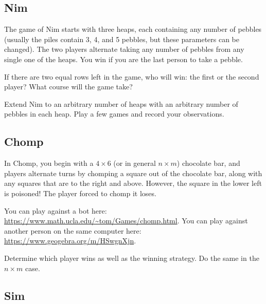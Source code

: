 \documentclass{article}
\begin{document}
\subsection{Nim}

The game of Nim starts with three heaps, each containing any number of pebbles (usually the piles contain 3, 4, and 5 pebbles, but these parameters can be changed).
The two players alternate taking any number of pebbles from any single one of the heaps.
You win if you are the last person to take a pebble.

\begin{exercise}
    If there are two equal rows left in the game, who will win: the first or the second player?
    What course will the game take?
\end{exercise}

\begin{exercise}
    Extend Nim to an arbitrary number of heaps with an arbitrary number of pebbles in each heap. 
    Play a few games and record your observations.
\end{exercise}

\subsection{Chomp}

In Chomp, you begin with a \(4\times 6\) (or in general \(n\times m\)) chocolate bar, and players alternate turns by chomping a square out of the chocolate bar, along with any squares that are to the right and above.
However, the square in the lower left is poisoned!
The player forced to chomp it loses.

You can play against a bot here: \url{https://www.math.ucla.edu/~tom/Games/chomp.html}.
You can play against another person on the same computer here: \url{https://www.geogebra.org/m/HSwgnXjn}.


\begin{exercise}
    Determine which player wins as well as the winning strategy.
    Do the same in the \(n\times m\) case.
\end{exercise}

\subsection{Sim}
\end{document}
